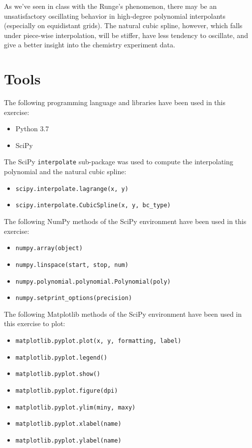 \documentclass{article}
\newcommand{\code}{\texttt}
\begin{document}
As we've seen in class with the Runge's phenomenon, there may be an unsatisfactory oscillating behavior in high-degree polynomial interpolants (especially on equidistant grids). The natural cubic spline, however, which falls under piece-wise interpolation, will be stiffer, have less tendency to oscillate, and give a better insight into the chemistry experiment data. 

\section{Tools}
The following programming language and libraries have been used in this exercise:
\begin{itemize}
  \item Python 3.7
  \item SciPy
\end{itemize}
The SciPy \code{interpolate} sub-package was used to compute the interpolating polynomial and the natural cubic spline:
\begin{itemize}
  \item \code{scipy.interpolate.lagrange(x, y)}
  \item \code{scipy.interpolate.CubicSpline(x, y, bc\_type)}
\end{itemize}

The following NumPy methods of the SciPy environment have been used in this exercise:
\begin{itemize}
  \item \code{numpy.array(object)}
  \item \code{numpy.linspace(start, stop, num)}
  \item \code{numpy.polynomial.polynomial.Polynomial(poly)}
  \item \code{numpy.setprint\_options(precision)}
  \end{itemize}
The following Matplotlib methods of the SciPy environment have been used in this exercise to plot:
 \begin{itemize}
  \item \code{matplotlib.pyplot.plot(x, y, formatting, label)}
  \item \code{matplotlib.pyplot.legend()}
  \item \code{matplotlib.pyplot.show()}
  \item \code{matplotlib.pyplot.figure(dpi)}
  \item \code{matplotlib.pyplot.ylim(miny, maxy)}
  \item \code{matplotlib.pyplot.xlabel(name)}
  \item \code{matplotlib.pyplot.ylabel(name)}
  \end{itemize}
  
\end{document}
